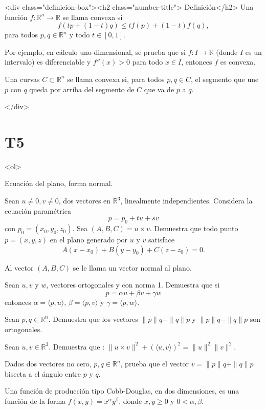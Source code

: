 \documentclass{article}
\theoremstyle{definition}
\begin{document}
  

	<div class="definicion-box"><h2 class="number-title">  Definición</h2>
	Una función $f: \mathbb{R}^n \to \mathbb{R}$ se llama convexa si 
	$$f( tp+(1-t)q ) \leq  tf(p)+(1-t)f(q),$$ 
	para todos $p,q \in \mathbb{R}^n$ y todo $t \in [0,1]$. 
	
	Por ejemplo, en cálculo uno-dimensional, se prueba que si $f: I \to \mathbb{R}$ (donde $I$ es un intervalo)
	es diferenciable y $f''(x)>0$ para todo $x\in I$, entonces $f$ es convexa.
	
	Una curvas $C\subset \mathbb{R}^n$ se llama convexa si, para todos $p,q\in C$, el segmento que une
	$p$ con $q$ queda por arriba del segmento de  $C$ que va de $p$ a $q$.
	
	</div>


        \section*{T5}
  
  <ol>

\item Ecuación del plano, forma normal. 

Sean $u\ne 0, v\ne 0$, dos vectores en $\mathbb{R}^3$, linealmente independientes. Considera la ecuación 
paramétrica
$$
p=p_0+tu+sv
$$	
con $p_0=(x_0,y_0,z_0)$. Sea $(A,B,C)=u\times v$. Demuestra que todo punto $p=(x,y,z)$ en el plano
generado por $u$ y $v$ satisface
$$
A(x-x_0)+B(y-y_0)+C(z-z_0)=0.
$$

Al vector $(A,B,C)$ se le llama un  vector normal al plano.


\item Sean $u,v$ y $w$, vectores ortogonales y con norma 1. Demuestra que si
  $$
  p=\alpha u + \beta v + \gamma w
  $$
  entonces $\alpha = \langle p, u \rangle$, $\beta=\langle p, v \rangle$ y $\gamma= \langle p, w \rangle$.
  
    \item Sean $p,q\in \mathbb{R}^n$. Demuestra que los vectores $\|p\|q+\|q\|p$ y $\|p\|q-\|q\|p$ son ortogonales.
 

      \item Sean $u,v\in \mathbb{R}^3$. Demuestra que : $\|u\times v \|^2+ (\langle u,v \rangle)^2=\|u\|^2\|v\|^2$.

    \item Dados dos vectores no cero, $p,q\in \mathbb{R}^n$, prueba que el vector $v=\|p\|q+\|q\|p$ bisecta a el
    ángulo entre $p$ y $q$.
    
	
	\item Una función de producción tipo Cobb-Douglas, en dos dimensiones, es una función
	de la forma $f(x,y)=x^\alpha y^\beta$, donde $x,y \geq 0$ y $0<\alpha, \beta$.
	
\end{document}
